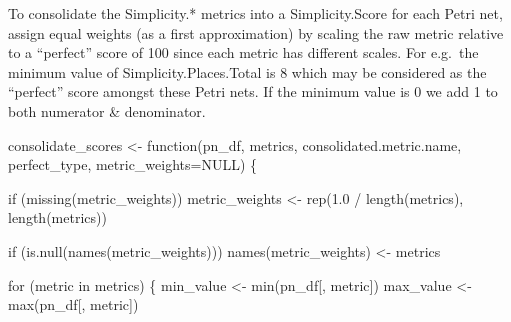 \documentclass[]{article}
\newenvironment{Shaded}{\begin{snugshade}}{\end{snugshade}}
\newcommand{\KeywordTok}[1]{\textcolor[rgb]{0.94,0.87,0.69}{{#1}}}
\newcommand{\DataTypeTok}[1]{\textcolor[rgb]{0.87,0.87,0.75}{{#1}}}
\newcommand{\FloatTok}[1]{\textcolor[rgb]{0.75,0.75,0.82}{{#1}}}
\newcommand{\StringTok}[1]{\textcolor[rgb]{0.80,0.58,0.58}{{#1}}}
\newcommand{\OtherTok}[1]{\textcolor[rgb]{0.94,0.94,0.56}{{#1}}}
\newcommand{\NormalTok}[1]{\textcolor[rgb]{0.80,0.80,0.80}{{#1}}}
\begin{document}
To consolidate the Simplicity.* metrics into a Simplicity.Score for each
Petri net, assign equal weights (as a first approximation) by scaling
the raw metric relative to a ``perfect'' score of 100 since each metric
has different scales. For e.g.~the minimum value of
Simplicity.Places.Total is 8 which may be considered as the ``perfect''
score amongst these Petri nets. If the minimum value is 0 we add 1 to
both numerator \& denominator.

\begin{Shaded}
\begin{Highlighting}[]
\NormalTok{consolidate_scores <-}\StringTok{ }\NormalTok{function(pn_df, metrics, consolidated.metric.name, }
                               \NormalTok{perfect_type,}
                               \DataTypeTok{metric_weights=}\OtherTok{NULL}\NormalTok{) \{}
    
    \NormalTok{if (}\KeywordTok{missing}\NormalTok{(metric_weights))}
        \NormalTok{metric_weights <-}\StringTok{ }\KeywordTok{rep}\NormalTok{(}\FloatTok{1.0} \NormalTok{/}\StringTok{ }\KeywordTok{length}\NormalTok{(metrics), }\KeywordTok{length}\NormalTok{(metrics))}
    
    \NormalTok{if (}\KeywordTok{is.null}\NormalTok{(}\KeywordTok{names}\NormalTok{(metric_weights)))}
        \KeywordTok{names}\NormalTok{(metric_weights) <-}\StringTok{ }\NormalTok{metrics}
    
    \NormalTok{for (metric in metrics) \{}
        \NormalTok{min_value <-}\StringTok{ }\KeywordTok{min}\NormalTok{(pn_df[, metric])}
        \NormalTok{max_value <-}\StringTok{ }\KeywordTok{max}\NormalTok{(pn_df[, metric])}
        

\end{Highlighting}
\end{Shaded}
\end{document}
